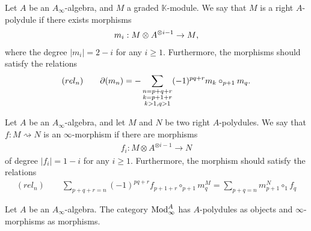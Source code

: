 \documentclass[../thesis.tex]{subfiles}
\begin{document}
            \begin{definition}[$A$-polydule]
                Let $A$ be an $A_\infty$-algebra, and $M$ a graded $\mathbb{K}$-module. We say that $M$ is a right $A$-polydule if there exists morphisms
                \begin{align*}
                    m_i : M \otimes A^{\otimes i - 1} \rightarrow M\tt{,}
                \end{align*}
                where the degree $|m_i| = 2 - i$ for any $i \geq 1$. Furthermore, the morphisms should satisfy the relations
                \begin{align*}
                    (rel_n) \qquad \partial(m_n) = - \sum_{\substack{n = p + q + r \\ k = p + 1 + r \\ k > 1, q > 1}}(-1)^{pq+r}m_k\circ_{p+1}m_q\tt{.}
                \end{align*}
            \end{definition}

            \begin{definition}
                Let $A$ be an $A_\infty$-algebra, and let $M$ and $N$ be two right $A$-polydules. We say that $f : M \rightsquigarrow N$ is an $\infty$-morphism if there are morphisms
                \begin{align*}
                    f_i : M \otimes A^{\otimes i - 1} \rightarrow N
                \end{align*}
                of degree $|f_i| = 1 - i$ for any $i \geq 1$. Furthermore, the morphism should satisfy the relations
                \begin{align*}
                    (rel_n)\qquad \sum_{p+q+r = n} (-1)^{pq+r}f_{p+1+r} \circ_{p+1} m^M_{q} = \sum_{p+q = n} m^N_{p+1} \circ_1 f_q
                \end{align*}
            \end{definition}


            \begin{definition}
                Let $A$ be an $A_\infty$-algebra. The category $\tt{Mod}_\infty^A$ has $A$-polydules as objects and $\infty$-morphisms as morphisms.

            \end{definition}
\end{document}
